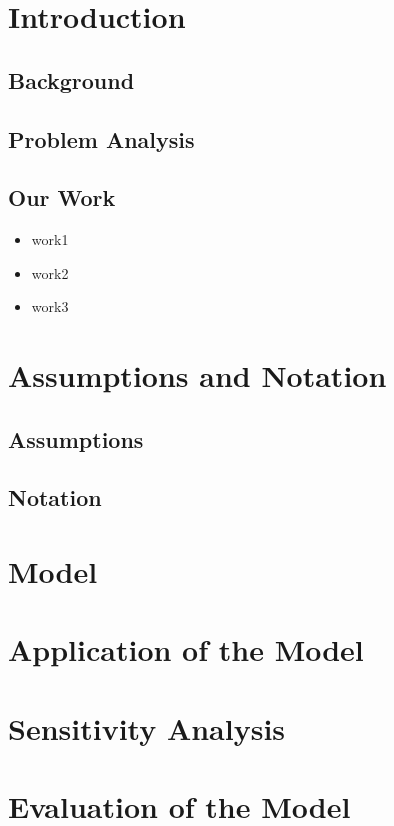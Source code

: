 \documentclass{HZNUMCM}
\begin{document}
\showSummarySheet
\showContents

  \section{Introduction}
    \subsection{Background}
    \subsection{Problem Analysis}
    \subsection{Our Work}
    \begin{itemize}
      \item work1
      \item work2
      \item work3
    \end{itemize}

  \section{Assumptions and Notation}
    \subsection{Assumptions}
    \subsection{Notation}

  \section{Model}

  \section{Application of the Model}

  \section{Sensitivity Analysis}

  \section{Evaluation of the Model}
\end{document}
